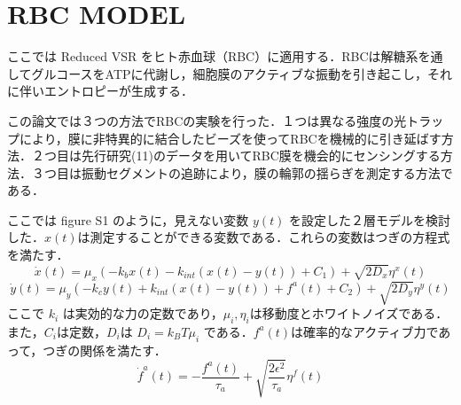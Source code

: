 \documentclass{jsarticle}
\numberwithin{equation}{section}
\theoremstyle{definition}
\begin{document}
\section{RBC MODEL}
ここでは Reduced VSR をヒト赤血球（RBC）に適用する．RBCは解糖系を通してグルコースをATPに代謝し，細胞膜のアクティブな振動を引き起こし，それに伴いエントロピーが生成する．\par 
この論文では３つの方法でRBCの実験を行った．１つは異なる強度の光トラップにより，膜に非特異的に結合したビーズを使ってRBCを機械的に引き延ばす方法．２つ目は先行研究(11)のデータを用いてRBC膜を機会的にセンシングする方法．３つ目は振動セグメントの追跡により，膜の輪郭の揺らぎを測定する方法である．\par 
ここでは figure S1 のように，見えない変数 $y(t)$ を設定した２層モデルを検討した．$x(t)$は測定することができる変数である．これらの変数はつぎの方程式を満たす．
\begin{equation}
  \dot{x}(t) = \mu_x (-k_b x(t) - k_{int}(x(t) - y(t)) + C_1) + \sqrt{2D_x} \eta^x (t) 
\end{equation}
\begin{equation}
  \dot{y}(t) = \mu_y (-k_c y(t) + k_{int}(x(t) - y(t)) + f^a (t) + C_2) + \sqrt{2D_y} \eta^y (t) 
\end{equation}
ここで $k_{i}$ は実効的な力の定数であり，$\mu_{i}, \eta_{i}$は移動度とホワイトノイズである．また，$C_i$は定数，$D_i$は $D_i = k_B T \mu_i$ である．$f^a (t)$は確率的なアクティブ力であって，つぎの関係を満たす．
\begin{equation}
  \dot{f}^a (t) = - \frac{f^a (t)}{\tau_a} + \sqrt{\frac{2 \epsilon^2}{\tau_a}} \eta^f (t)
\end{equation}
\end{document}

